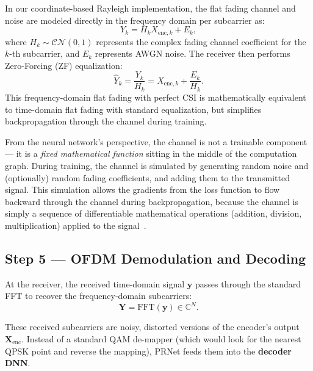 In our coordinate-based Rayleigh implementation, the flat fading channel and noise are modeled directly in the frequency domain per subcarrier as:
\begin{equation*}
    Y_k = H_k X_{\mathrm{enc},k} + E_k,
\end{equation*}
where $H_k \sim \mathcal{CN}(0, 1)$ represents the complex fading channel coefficient for the $k$-th subcarrier, and $E_k$ represents AWGN noise. The receiver then performs Zero-Forcing (ZF) equalization:
\begin{equation*}
    \hat{Y}_k = \frac{Y_k}{H_k} = X_{\mathrm{enc},k} + \frac{E_k}{H_k}.
\end{equation*}
This frequency-domain flat fading with perfect CSI is mathematically equivalent to time-domain flat fading with standard equalization, but simplifies backpropagation through the channel during training.

\begin{keyinsight}
    From the neural network's perspective, the channel is not a trainable component --- it is a \emph{fixed mathematical function} sitting in the middle of the computation graph.  During training, the channel is simulated by generating random noise and (optionally) random fading coefficients, and adding them to the transmitted signal.  This simulation allows the gradients from the loss function to flow backward through the channel during backpropagation, because the channel is simply a sequence of differentiable mathematical operations (addition, division, multiplication) applied to the signal~\cite{kim2017novel}.
\end{keyinsight}


\subsection{Step 5 --- OFDM Demodulation and Decoding}

At the receiver, the received time-domain signal $\bm{y}$ passes through the standard FFT to recover the frequency-domain subcarriers:
\begin{equation*}
    \bm{Y} = \mathrm{FFT}(\bm{y}) \in \mathbb{C}^{N}.
\end{equation*}

These received subcarriers are noisy, distorted versions of the encoder's output $\bm{X}_{\mathrm{enc}}$.  Instead of a standard QAM de-mapper (which would look for the nearest QPSK point and reverse the mapping), PRNet feeds them into the \textbf{decoder DNN}.

